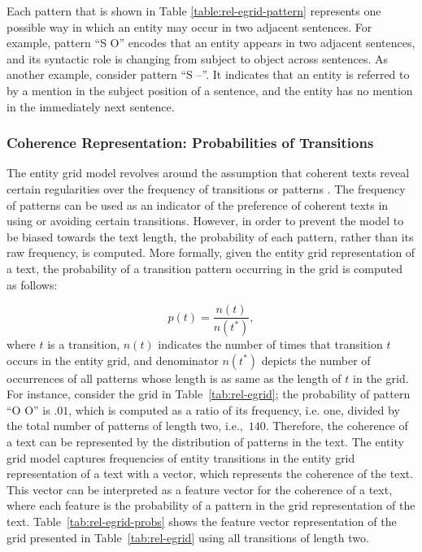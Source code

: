 Each pattern that is shown in Table \ref{table:rel-egrid-pattern} represents one possible way in which an entity may occur in two adjacent sentences. 
For example, pattern ``S O'' encodes that an entity appears in two adjacent sentences, and its syntactic role is changing from subject to object across sentences. 
As another example, consider pattern ``S --''. 
It indicates that an entity is referred to by a mention in the subject position of a sentence, and the entity has no mention in the immediately next sentence. 

\subsubsection{Coherence Representation: Probabilities of Transitions}
%
The entity grid model revolves around the assumption that coherent texts reveal certain regularities over the frequency of transitions or patterns \cite{barzilay05a,barzilay08}.    
The frequency of patterns can be used as an indicator of the preference of coherent texts in using or avoiding certain transitions. 
However, in order to prevent the model to be biased towards the text length, the probability of each pattern, rather than its raw frequency, is computed. 	 
More formally, given the entity grid representation of a text, the probability of a transition pattern occurring in the grid is computed as follows:

\begin{equation}
p(t) = \frac{n(t)}{n(t^*)},
\end{equation}
where $t$ is a transition, $n(t)$ indicates the number of times that transition $t$ occurs in the entity grid, and denominator $n(t^*)$ depicts the number of occurrences of all patterns whose length is as same as the length of $t$ in the grid. 
For instance, consider the grid in Table~\ref{tab:rel-egrid}; the probability of pattern ``O O'' is $.01$, which is computed as a ratio of its frequency, i.e. one, divided by the total number of patterns of length two, i.e.,\ $140$. 
Therefore, the coherence of a text can be represented by the distribution of patterns in the text. 
The entity grid model captures frequencies of entity transitions in the entity grid representation of a text with a vector, which represents the coherence of the text. 
This vector can be interpreted as a feature vector for the coherence of a text, where each feature is the probability of a pattern in the grid representation of the text.  
Table~\ref{tab:rel-egrid-probs} shows the feature vector representation of the grid presented in Table~\ref{tab:rel-egrid} using all transitions of length two. 

